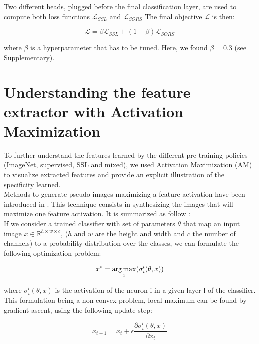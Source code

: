 Two different heads, plugged before the final classification layer, are used to compute both loss functions $\mathcal{L}_{SSL}$  and $\mathcal{L}_{SORS}$
The final objective $\mathcal{L}$ is then:

\begin{equation}
\mathcal{L} = \beta \mathcal{L}_{SSL} + (1- \beta) \mathcal{L}_{SORS}
\label{eq:joint-eq}
\end{equation}

where $\beta$ is a hyperparameter that has to be tuned. Here, we found $\beta=0.3$ (see Supplementary).

\section{Understanding the feature extractor with Activation Maximization}
To further understand the features learned by the different pre-training policies (ImageNet, supervised, SSL and mixed), we used Activation Maximization (AM) to visualize extracted features  and provide an explicit  illustration of the specificity learned. \\
Methods to generate pseudo-images maximizing a feature activation have been introduced in \citep{erhan_visualizing_2009}. This technique consists in synthesizing the images that will maximize one feature activation. It is summarized as follow \citep{nguyen_understanding_2019}: \\
If we consider a trained classifier with set of parameters $\theta$ that map an input image $x \in \mathbb{R}^{h \times w \times c} $, ($h$ and $w$ are the height and width and $c$ the number of channels) to a probability distribution over the classes, we can formulate the following optimization problem:

\begin{equation}
x^{*} = \operatorname*{arg\,max}_{x}(\sigma^{l}_{i}(\theta, x))
\end{equation}

where $\sigma^{l}_{i}(\theta, x)$ is the activation of the neuron i in a given layer l of the classifier. This formulation being a non-convex problem, local maximum can be found by gradient ascent, using the following update step:

\begin{equation}
x_{t+1} = x_{t} + \epsilon \frac{\partial \sigma^{l}_{i}(\theta, x)}{\partial x_t}
\end{equation}



